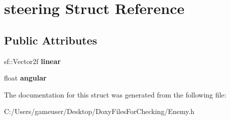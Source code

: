 \hypertarget{structsteering}{}\section{steering Struct Reference}
\label{structsteering}
\subsection*{Public Attributes}
\begin{DoxyCompactItemize}
\item 
\mbox{\label{structsteering_a01f13be90989521983642062826b007b}} 
sf\+::\+Vector2f {\bfseries linear}
\item 
\mbox{\label{structsteering_a41610d9a1e66b78583be3499c2d1e27f}} 
float {\bfseries angular}
\end{DoxyCompactItemize}


The documentation for this struct was generated from the following file\+:\begin{DoxyCompactItemize}
\item 
C\+:/\+Users/gameuser/\+Desktop/\+Doxy\+Files\+For\+Checking/Enemy.\+h\end{DoxyCompactItemize}
